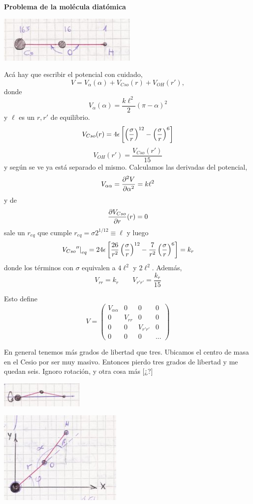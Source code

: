 \documentclass[10pt,oneside]{CBFT_book}
\begin{document}
\begin{ejemplo}{\bf Problema de la molécula diatómica}

\includegraphics[scale=0.5]{images/fig_mc_molecula_1.jpg}

Acá hay que escribir el potencial con cuidado,
\[
	V = V_\alpha(\alpha) + V_{Cso}(r) + V_{OH}(r'),
\]
donde 
\[
	V_\alpha(\alpha) = \frac{k\ell^2}{2}(\pi - \alpha)^2
\]
y $\ell$ es un $r, r'$ de equilibrio.
\[
	V_{Cso}(r) = 4 \epsilon 
	\left[ \Frac{\sigma}{r}^{12} - \Frac{\sigma}{r}^6\right]
\]
\[
	V_{OH}(r') = \frac{V_{Cso}(r') }{15}
\]
y según se ve ya está separado el mismo.
Calculamos las derivadas del potencial,
\[
	V_{\alpha\alpha} = \dpar[2]{V}{\alpha} = k\ell^2 
\]
y de 
\[
	\dpar{V_{Cso}}{r}(r) = 0
\]
sale un $r_{eq}$ que cumple $r_{eq} = \sigma 2^{1/12}\equiv \ell$ y luego
\[
	\left. V_{Cso}{''}\right|_{eq} = 24 \epsilon 
	\left[ \frac{26}{r^2} \Frac{\sigma}{r}^{12} - \frac{7}{r^2} \Frac{\sigma}{r}^6\right] = k_r
\]
donde los términos con $\sigma$ equivalen a $4\ell^2$ y $2\ell^2$. Además,
\[
	V_{rr} = k_r \qquad V_{r'r'} = \frac{k_r}{15}
\]

Esto define
\[
	V = \begin{pmatrix}
	 V_{\alpha\alpha} & 0 & 0 & 0 \\
	 0 & V_{rr} & 0 & 0 \\
	 0 & 0 & V_{r'r'} & 0  \\
	 0 & 0 & 0 & ...
	 \end{pmatrix}
\]

En general tenemos más grados de libertad que tres. Ubicamos el centro de masa en
el Cesio por ser muy masivo. Entonces pierdo tres grados de libertad y me quedan
seis. Ignoro rotación, y otra cosa más [¿?]

\includegraphics[scale=0.5]{images/fig_mc_molecula_3.jpg}

\includegraphics[scale=0.5]{images/fig_mc_molecula_2.jpg}


\end{ejemplo}
\end{document}
